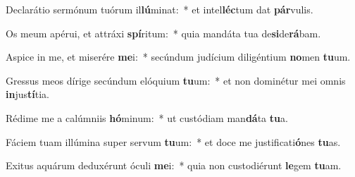 \item Declarátio sermónum tuórum il\textbf{lú}minat:~* et intel\textbf{léc}tum dat \textbf{pár}vulis.
\item Os meum apérui, et attráxi \textbf{spí}ritum:~* quia mandáta tua de\textbf{si}de\textbf{rá}bam.
\item Aspice in me, et miserére \textbf{me}i:~* secúndum judícium diligéntium \textbf{no}men \textbf{tu}um.
\item Gressus meos dírige secúndum elóquium \textbf{tu}um:~* et non dominétur mei omnis \textbf{in}jus\textbf{tí}tia.
\item Rédime me a calúmniis \textbf{hó}minum:~* ut custódiam man\textbf{dá}ta \textbf{tu}a.
\item Fáciem tuam illúmina super servum \textbf{tu}um:~* et doce me justificati\textbf{ó}nes \textbf{tu}as.
\item Exitus aquárum deduxérunt óculi \textbf{me}i:~* quia non custodiérunt \textbf{le}gem \textbf{tu}am.
